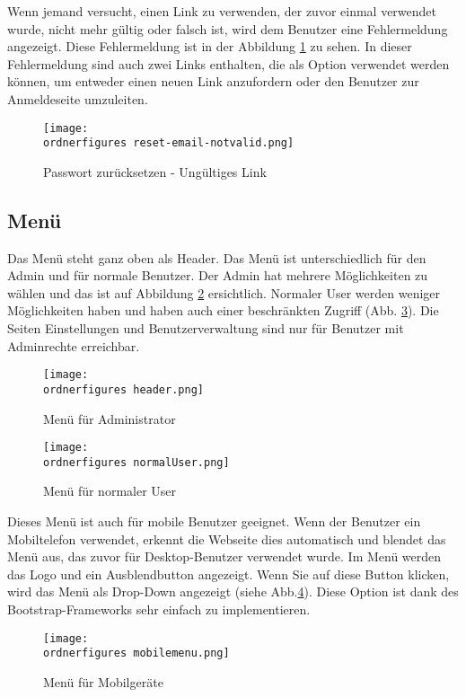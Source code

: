 Wenn jemand versucht, einen Link zu verwenden, der zuvor einmal verwendet wurde, nicht mehr gültig oder falsch ist, wird dem Benutzer eine Fehlermeldung angezeigt. Diese Fehlermeldung ist in der Abbildung \ref{fi:invalidlink} zu sehen. In dieser Fehlermeldung sind auch zwei Links enthalten, die als Option verwendet werden können, um entweder einen neuen Link anzufordern oder den Benutzer zur Anmeldeseite umzuleiten.



\begin{figure}[H]
	\centering
	\texttt{[image: \\ordnerfigures reset-email-notvalid.png]}
	\caption{Passwort zurücksetzen - Ungültiges Link}
	\label{fi:invalidlink}
\end{figure}


\subsection{Menü}

Das Menü steht ganz oben als Header. Das Menü ist unterschiedlich für den Admin und für normale Benutzer. Der Admin hat mehrere Möglichkeiten zu wählen und das ist auf Abbildung \ref{fi:menu} ersichtlich. Normaler User werden weniger Möglichkeiten haben und haben auch einer beschränkten Zugriff (Abb. \ref{fi:normalerUser}). Die Seiten Einstellungen und Benutzerverwaltung sind nur für Benutzer mit Adminrechte erreichbar. 

\begin{figure}[H]
	\centering
	\texttt{[image: \\ordnerfigures header.png]}
	\caption{Men\"u für Administrator}
	\label{fi:menu}
\end{figure}

\begin{figure}[H]
	\centering
	\texttt{[image: \\ordnerfigures normalUser.png]}
	\caption{Men\"u für normaler User}
	\label{fi:normalerUser}
\end{figure}

Dieses Menü ist auch für mobile Benutzer geeignet. Wenn der Benutzer ein Mobiltelefon verwendet, erkennt die Webseite dies automatisch und blendet das Menü aus, das zuvor für Desktop-Benutzer verwendet wurde. Im Menü werden das Logo und ein Ausblendbutton angezeigt. Wenn Sie auf diese Button klicken, wird das Menü als Drop-Down angezeigt (siehe Abb.\ref{fi:mobilemenu}). Diese Option ist dank des Bootstrap-Frameworks sehr einfach zu implementieren.
	
\begin{figure}[H]
	\centering
	\texttt{[image: \\ordnerfigures mobilemenu.png]}
	\caption{Men\"u für Mobilgeräte}
	\label{fi:mobilemenu}
\end{figure}

